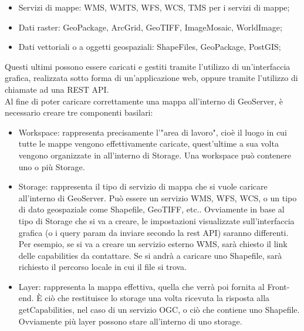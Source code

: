\begin{itemize}
      \item Servizi di mappe: WMS, WMTS, WFS, WCS, TMS per i servizi di mappe;
      \item Dati raster: GeoPackage, ArcGrid, GeoTIFF, ImageMosaic, WorldImage;
      \item Dati vettoriali o a oggetti geospaziali: ShapeFiles, GeoPackage, PostGIS;
\end{itemize}
Questi ultimi possono essere caricati e gestiti tramite l'utilizzo di un'interfaccia grafica, realizzata sotto forma di un'applicazione web, oppure tramite l'utilizzo di chiamate ad una REST API.
\\Al fine di poter caricare correttamente una mappa all'interno di GeoServer, è necessario creare tre componenti basilari:
\begin{itemize}
      \item Workspace: rappresenta precisamente l'"area di lavoro", cioè il luogo in cui tutte le mappe vengono effettivamente caricate, quest'ultime a sua volta vengono organizzate in all'interno di Storage. Una workspace può contenere uno o più Storage.
      \item Storage: rappresenta il tipo di servizio di mappa che si vuole caricare all'interno di GeoServer. Può essere un servizio WMS, WFS, WCS, o un tipo di dato geospaziale come Shapefile, GeoTIFF, etc.. Ovviamente in base al tipo di Storage che si va a creare, le impostazioni visualizzate sull'interfaccia grafica (o i query param da inviare secondo la rest API) saranno differenti. Per esempio, se si va a creare un servizio esterno WMS, sarà chiesto il link delle capabilities da contattare. Se si andrà a caricare uno Shapefile, sarà richiesto il percorso locale in cui il file si trova.
      \item Layer: rappresenta la mappa effettiva, quella che verrà poi fornita al Front-end. È ciò che restituisce lo storage una volta ricevuta la risposta alla getCapabilities, nel caso di un servizio OGC, o ciò che contiene uno Shapefile. Ovviamente più layer possono stare all'interno di uno storage.
\end{itemize}
